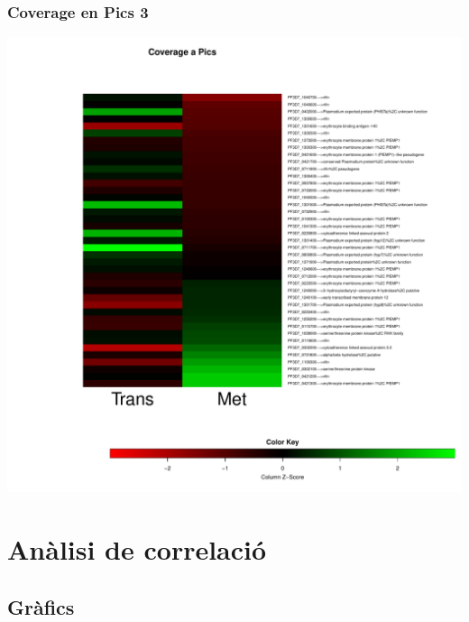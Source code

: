 \documentclass{article}\usepackage[]{graphicx}\usepackage[]{color}
\newenvironment{knitrout}{}{} %
\begin{document}
\subsubsection{Coverage en Pics 3}
\begin{knitrout}
\color{fgcolor}

{\centering \includegraphics[width=.9\linewidth]{figure/minimal-met_covapics_3-1} 

}



\end{knitrout}
\clearpage



\section{Anàlisi de correlació}
\subsection{Gràfics}
\end{document}
